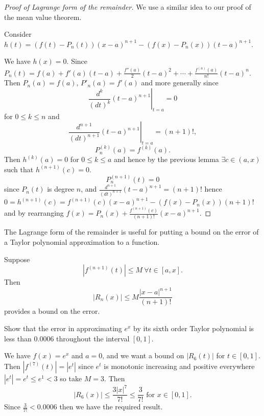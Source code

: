 \documentclass[10pt, a4paper]{article}
\begin{document}
\begin{proof}[Proof of Lagrange form of the remainder]
    We use a similar idea to our proof of the mean value theorem.
    
    Consider $h(t) = (f(t) - P_n(t))(x - a) ^ {n + 1} - (f(x) - P_n(x))(t - a) ^ {n + 1}$.

    We have $h(x) = 0$.
    Since $P_n(t) = f(a) + f'(a)(t - a) + \frac{f''(a)}{2}(t - a) ^ 2 + \dotsi + \frac{f ^ {(n)}(a)}{n!}(t - a) ^ n$.
    Then $P_n(a) = f(a)$,
    $P'_n(a) = f'(a)$ and more generally since
    \[
    \left.\frac{d ^ k}{(dt) ^ k}(t - a) ^ {n + 1}\right|_{t = a} = 0
    \]
    for $0 \leq k \leq n$ and
    \[
    \left.\frac{d ^ {n + 1}}{(dt) ^ {n + 1}}(t - a) ^ {n + 1}\right|_{t = a} = (n + 1)!,
    \]
    \[
    P_n ^ {(k)}(a) = f ^{(k)}(a).
    \]
    Then $h ^ {(k)}(a) = 0$ for $0 \leq k \leq a$ and hence by the previous lemma $\exists c \in (a, x)$ such that $h ^ {(n + 1)}(c) = 0$.
    \[
    P_n ^ {(n + 1)}(t) = 0
    \]
    since $P_n(t)$ is degree $n$,
    and $\frac{d ^ {n + 1}}{(dt) ^ {n + 1}}(t - a) ^ {n + 1} = (n + 1)!$ hence $0 = h ^ {(n + 1)}(c) = f ^ {(n + 1)}(c)(x - a) ^ {n + 1} - (f(x) - P_n(x))(n + 1)!$ and by rearranging $f(x) = P_n(x) + \frac{f ^ {(n + 1)}(c)}{(n + 1)!}(x - a) ^ {n + 1}$.
\end{proof}

The Lagrange form of the remainder is useful for putting a bound on the error of a Taylor polynomial approximation to a function.

Suppose
\[
|f ^ {(n + 1)}(t)| \leq M\ \forall t \in [a, x].
\]
Then
\[
|R_n(x)| \leq M\frac{|x - a| ^ {n + 1}}{(n + 1)!}
\]
provides a bound on the error.
\begin{example}
    Show that the error in approximating $e ^ x$ by its sixth order Taylor polynomial is less than $0.0006$ throughout the interval $[0, 1]$.
    
    We have $f(x) = e ^ x$ and $a = 0$,
    and we want a bound on $|R_6(t)|$ for $t \in [0, 1]$.
    Then $|f ^ {(7)}(t)| = |e ^ t|$ since $e ^ t$ is monotonic increasing and positive everywhere $|e ^ t| = e ^ t \leq e ^ 1 < 3$ so take
    $M = 3$.
    Then
    \[
    |R_6(x)| \leq \frac{3|x| ^ {7}}{7!} \leq \frac{3}{7!} \text{ for } x \in [0, 1].
    \]
    Since $\frac{3}{7!} < 0.0006$ then we have the required result.
\end{example}
\end{document}
